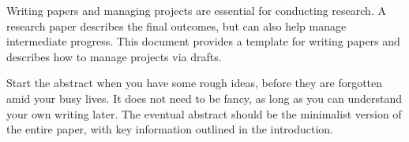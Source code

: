 Writing papers and managing projects are essential for conducting research.
A research paper describes the final outcomes, but can also help manage intermediate progress.
This document provides a template for writing papers and describes how to manage projects via drafts.

Start the abstract when you have some rough ideas, before they are forgotten amid your busy lives.
It does not need to be fancy, as long as you can understand your own writing later.
The eventual abstract should be the minimalist version of the entire paper, with key information outlined in the introduction.
